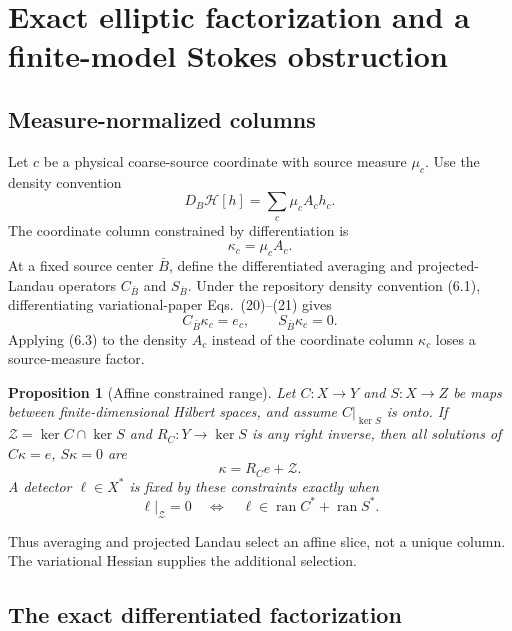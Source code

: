 \documentclass[11pt]{article}
\newtheorem{proposition}[theorem]{Proposition}
\theoremstyle{definition}
\begin{document}
\section{Exact elliptic factorization and a finite-model Stokes obstruction}

\subsection{Measure-normalized columns}

Let \(c\) be a physical coarse-source coordinate with source measure
\(\mu_c\).  Use the density convention
\[
D_B\mathcal H[h]=\sum_c\mu_cA_ch_c.
\tag{6.1}
\]
The coordinate column constrained by differentiation is
\[
\kappa_c=\mu_cA_c.
\tag{6.2}
\]
At a fixed source center \(\bar B\), define the differentiated averaging
and projected-Landau operators \(C_{\bar B}\) and \(S_{\bar B}\).  Under
the repository density convention (6.1), differentiating variational-paper
Eqs.~(20)--(21) gives \cite{balaban1985variational}
\[
C_{\bar B}\kappa_c=e_c,
\qquad
S_{\bar B}\kappa_c=0.
\tag{6.3}
\]
Applying (6.3) to the density \(A_c\) instead of the coordinate column
\(\kappa_c\) loses a source-measure factor.

\begin{proposition}[Affine constrained range]
\label{prop:affine-range}
Let \(C:X\to Y\) and \(S:X\to Z\) be maps between finite-dimensional Hilbert
spaces, and assume \(C|_{\ker S}\) is onto.  If
\(\mathcal Z=\ker C\cap\ker S\) and \(R_C:Y\to\ker S\) is any right inverse,
then all solutions of \(C\kappa=e\), \(S\kappa=0\) are
\[
\kappa=R_Ce+\mathcal Z.
\tag{6.4}
\]
A detector \(\ell\in X^*\) is fixed by these constraints exactly when
\[
\ell|_{\mathcal Z}=0
\quad\Longleftrightarrow\quad
\ell\in\operatorname{ran}C^*+\operatorname{ran}S^*.
\tag{6.5}
\]
\end{proposition}

Thus averaging and projected Landau select an affine slice, not a unique
column.  The variational Hessian supplies the additional selection.

\subsection{The exact differentiated factorization}
\end{document}
